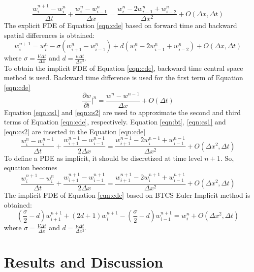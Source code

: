 \documentclass[letterpaper,12pt]{article}
\begin{document}
\begin{equation}
	\frac{w_{i}^{n+1}-{w_{i}^{n}}}{\Delta t}+\frac{w_{i}^{n}-w_{i-1}^{n}}{\Delta x}
	=\frac{w_{i}^{n}-2w_{i-1}^{n}+w_{i-2}^{n}}{\Delta x^2}+O(\Delta x,\Delta t)
\end{equation}
The explicit FDE of Equation \ref{eqn:cde} based on forward time and backward spatial
differences is obtained:
\begin{equation}
	w_{i}^{n+1}= w_{i}^{n}-\sigma(w_{i+1}^{n}-w_{i-1}^{n})+d(w_{i}^{n}-2w_{i-1}^{n}+w_{i-2}^{n})+O(\Delta x,\Delta t)
\end{equation}
where $\sigma = \frac{V\Delta t}{\Delta x }$ and $d = \frac{\nu\Delta t}{\Delta x^2 }$.
\\ To obtain the implicit FDE of Equation \ref{eqn:cde}, backward time central space method is used.
Backward time difference is used for the first term of Equation \ref{eqn:cde}
\begin{equation}
	\frac{\partial w}{\partial t}\vert^{n}=\frac{w^{n}-w^{n-1}}{\Delta x}+O(\Delta t)
	\label{eqn:bt}
\end{equation}
Equation \ref{eqn:cs1} and \ref{eqn:cs2} are used to approximate the second and third
terms of Equation \ref{eqn:cde}, respectively. Equation \ref{eqn:bt}, \ref{eqn:cs1}
and \ref{eqn:cs2} are inserted in the Equation \ref{eqn:cde}
\begin{equation}
	\frac{w_{i}^{n}-{w_{i}^{n-1}}}{\Delta t}+\frac{w_{i+1}^{n-1}-w_{i-1}^{n-1}}{2\Delta x}
	=\frac{w_{i+1}^{n-1}-2w_{i}^{n-1}+w_{i-1}^{n-1}}{\Delta x^2}+O(\Delta x^2, \Delta t)
\end{equation}
To define a PDE as implicit, it should be discretized at time level $n+1$. So, equation becomes
\begin{equation}
	\frac{w_{i}^{n+1}-{w_{i}^{n}}}{\Delta t}+\frac{w_{i+1}^{n+1}-w_{i-1}^{n+1}}{2\Delta x}
	=\frac{w_{i+1}^{n+1}-2w_{i}^{n+1}+w_{i-1}^{n+1}}{\Delta x^2}+O(\Delta x^2, \Delta t)	
\end{equation}
The implicit FDE of Equation \ref{eqn:cde} based on BTCS Euler Implicit method is obtained:
\begin{equation}
	(\frac{\sigma}{2}-d)w_{i+1}^{n+1}+(2d+1)w_{i}^{n+1}-(\frac{\sigma}{2}-d)w_{i-1}^{n+1} = w_{i}^{n}+O(\Delta x^2,\Delta t)
\end{equation}
where $\sigma = \frac{V\Delta t}{\Delta x }$ and $d = \frac{\nu\Delta t}{\Delta x^2 }$.
\newpage
\section{Results and Discussion}
\end{document}
